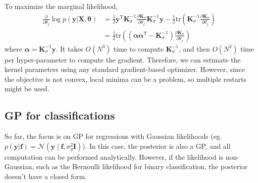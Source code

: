 \documentclass[11pt]{article}
\begin{document}
To maximize the marginal likelihood,
\[
\begin{aligned}
\frac{\partial}{\partial \theta_j} \log p(\boldsymbol{y} | \mathbf{X}, \boldsymbol{\theta}) &= \frac{1}{2} \boldsymbol{y}^\mathsf{T} \mathbf{K}_\sigma^{-1} \frac{\partial \mathbf{K}_\sigma}{\partial \theta_j} \mathbf{K}_\sigma^{-1} \boldsymbol{y} - \frac{1}{2} \text{tr}\left(\mathbf{K}_\sigma^{-1} \frac{\partial \mathbf{K}_\sigma}{\partial \theta_j}\right) \\
&= \frac{1}{2} \text{tr}\left( (\boldsymbol{\alpha}\boldsymbol{\alpha}^\mathsf{T} - \mathbf{K}_\sigma^{-1}) \frac{\partial \mathbf{K}_\sigma}{\partial \theta_j} \right)
\end{aligned}
\]
where $\boldsymbol{\alpha} = \mathbf{K}_\sigma^{-1} \boldsymbol{y}$. It takes $O(N^3)$ time to compute $\mathbf{K}_\sigma^{-1}$, and then $O(N^2)$ time per hyper-parameter to compute the gradient.
Therefore, we can estimate the kernel parameters using any standard gradient-based optimizer. However, since the objective is not convex, local minima can be a problem, so multiple restarts might be used.

\subsection{GP for classifications}
So far, the focus is on GP for regressions with Gaussian likelihoods (eg. $p(\boldsymbol{y}|\boldsymbol{f}) = \mathcal{N}(\boldsymbol{y} \mid \boldsymbol{f}, \sigma_y^2 \mathbf{I} )$).
In this case, the posterior is also a GP, and all computation can be performed analytically.
However, if the likelihood is non-Gaussian, such as the Bernoulli likelihood for binary classification, the posterior doesn't have a closed form.
\end{document}
